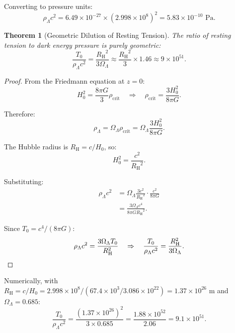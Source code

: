 \documentclass[11pt,a4paper]{article}
\newcommand{\rhocrit}{\ensuremath{\rho_{\mathrm{crit}}}}
\newcommand{\Tzero}{\ensuremath{T_0}}
\newcommand{\RH}{\ensuremath{R_{\mathrm{H}}}}
\newcommand{\OmegaLam}{\ensuremath{\Omega_\Lambda}}
\newtheorem{theorem}{Theorem}[section]
\theoremstyle{definition}
\theoremstyle{remark}
\begin{document}
Converting to pressure units:
\begin{equation}
\rho_\Lambda c^2 = 6.49 \times 10^{-27} \times (2.998 \times 10^8)^2 = 5.83 \times 10^{-10} \text{ Pa}.
\end{equation}

\begin{theorem}[Geometric Dilution of Resting Tension]
\label{thm:geometric_dilution}
The ratio of resting tension to dark energy pressure is purely geometric:
\begin{equation}
\label{eq:tension_dark_energy_ratio}
\boxed{\frac{\Tzero}{\rho_\Lambda c^2} = \frac{\RH^2}{3\OmegaLam} \approx \frac{\RH^2}{3} \times 1.46 \approx 9 \times 10^{51}.}
\end{equation}
\end{theorem}

\begin{proof}
From the Friedmann equation at $z = 0$:
\begin{equation}
H_0^2 = \frac{8\pi G}{3}\rhocrit \quad \Rightarrow \quad \rhocrit = \frac{3H_0^2}{8\pi G}.
\end{equation}

Therefore:
\begin{equation}
\rho_\Lambda = \OmegaLam \rhocrit = \OmegaLam \frac{3H_0^2}{8\pi G}.
\end{equation}

The Hubble radius is $\RH = c/H_0$, so:
\begin{equation}
H_0^2 = \frac{c^2}{\RH^2}.
\end{equation}

Substituting:
\begin{align}
\rho_\Lambda c^2 &= \OmegaLam \frac{3c^2}{\RH^2} \cdot \frac{c^2}{8\pi G} \\
&= \frac{3\OmegaLam c^4}{8\pi G \RH^2}.
\end{align}

Since $\Tzero = c^4/(8\pi G)$:
\begin{equation}
\rho_\Lambda c^2 = \frac{3\OmegaLam \Tzero}{\RH^2} \quad \Rightarrow \quad \frac{\Tzero}{\rho_\Lambda c^2} = \frac{\RH^2}{3\OmegaLam}. \qedhere
\end{equation}
\end{proof}

Numerically, with $\RH = c/H_0 = 2.998 \times 10^8 / (67.4 \times 10^3 / 3.086 \times 10^{22}) = 1.37 \times 10^{26}$ m and $\OmegaLam = 0.685$:
\begin{equation}
\frac{\Tzero}{\rho_\Lambda c^2} = \frac{(1.37 \times 10^{26})^2}{3 \times 0.685} = \frac{1.88 \times 10^{52}}{2.06} = 9.1 \times 10^{51}.
\end{equation}
\end{document}
